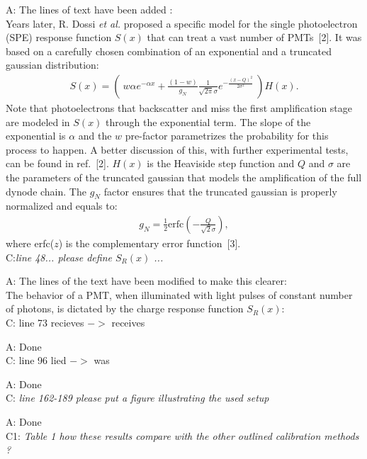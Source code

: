\documentclass[a4paper,11pt]{article}
\begin{document}
A: The lines of text have been added :
\\[1ex]
Years later, R. Dossi \emph{et al.} proposed a specific model for the single photoelectron (SPE) response function $S(x)$ that can treat a vast number of PMTs~[2]. 
It was based on a carefully chosen combination of an exponential and a truncated gaussian distribution:
\begin{align}
S(x) =    \left( \ w \alpha e^{-\alpha x } + \frac{(1-w)}{g_N} \frac{1}{\sqrt{2\pi}\sigma} e^{ - \frac{( x - Q )^2}{2\sigma^2}} \ \right) H(x).       \label{eq:S}
\end{align}
Note that photoelectrons that backscatter and miss the first amplification stage are modeled in $S(x)$ through the exponential term. 
The slope of the exponential is $\alpha$ and the $w$ pre-factor parametrizes the probability for this process to happen. 
A better discussion of this, with further experimental tests, can be found in ref.~[2]. 
$H(x)$ is the Heaviside step function and $Q$ and $\sigma$ are the parameters of the truncated gaussian that models the amplification of the full dynode chain.  
The $g_N$ factor ensures that the truncated gaussian is properly normalized and equals to:
\begin{align}
g_N = \frac{1}{2} \textrm{erfc} \left( - \frac{Q}{\sqrt{2}\sigma} \right), 
\end{align}
where erfc($z$) is the complementary error function~[3]. 
\\[1ex]

C:\emph{line 48... please define $S_R(x)$ ...}

A: The lines of the text have been modified to make this clearer:
\\[1ex]

The behavior of a PMT, when illuminated with light pulses of constant number of photons, is dictated by the charge response function $S_R(x)$:
\\[1ex]

C: line 73 recieves $->$ receives

A: Done
\\[1ex]

C: line 96 lied $->$ was

A: Done
\\[1ex]

C: \emph{line 162-189 please put a figure illustrating the used setup}

A: Done 
\\[1ex]

C1: \emph{Table 1 how these results compare with the other outlined calibration methods ?}
\end{document}
